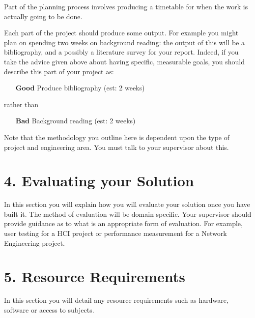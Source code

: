 \documentclass[11pt, a4paper, twoside, openright]{report}
\begin{document}
Part of the planning process involves producing a timetable for when
the work is actually going to be done.

Each part of the project should produce some output. For example you
might plan on spending two weeks on background reading: the output of
this will be a bibliography, and a possibly a literature survey for
your report. Indeed, if you take the advice given above about having
specific, measurable goals, you should describe this part of your
project as:

\begin{itemize}
  \item[\bf Good] Produce bibliography (est: 2 weeks)
\end{itemize}
rather than
\begin{itemize}
  \item[\bf Bad] Background reading (est: 2 weeks)
\end{itemize}

Note that the methodology you outline here is dependent upon the type
of project and engineering area. You must talk to your supervisor
about this.

\section*{4. Evaluating your Solution}

In this section you will explain how you will evaluate your solution
once you have built it. The method of evaluation will be domain
specific. Your supervisor should provide guidance as to what is an
appropriate form of evaluation. For example, user testing for a HCI
project or performance measurement for a Network Engineering project.

\section*{5. Resource Requirements}

In this section you will detail any resource requirements such as
hardware, software or access to subjects.

\backmatter

\nocite{*}

% 

\end{document}
